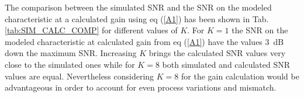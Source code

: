 \begin{table}[h]
\centering
{}
\caption{Comparison between the Simulated and Calculated SNR (in dB) for different values of $K$ as a function of Low-frequency gain in (dB)}
\label{tab:SIM_CALC_COMP}
\end{table}

The comparison between the simulated SNR and the SNR on the modeled characteristic at a calculated gain using eq (\ref{A1}) has been shown in Tab. \ref{tab:SIM_CALC_COMP} for different values of $K$. For $K=1$ the SNR on the modeled characteristic at calculated gain from eq (\ref{A1}) have the values 3~dB down the maximum SNR. Increasing $K$ brings the calculated SNR values very close to the simulated ones while for $K=8$ both simulated and calculated SNR values are equal. Nevertheless considering $K=8$ for the gain calculation would be advantageous in order to account for even process variations and mismatch.


